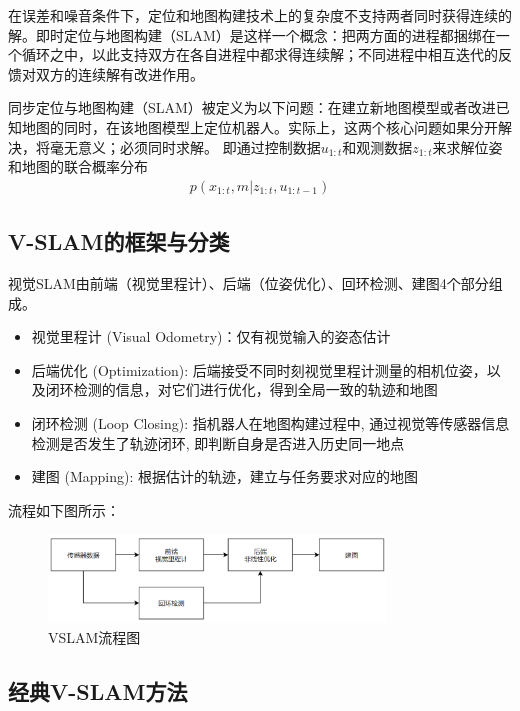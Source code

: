 \documentclass[cs4size,a4paper]{ctexart}
\numberwithin{equation}{section}
\numberwithin{table}{section}
\numberwithin{figure}{section}
\begin{document}
在误差和噪音条件下，定位和地图构建技术上的复杂度不支持两者同时获得连续的解。即时定位与地图构建（SLAM）是这样一个概念：把两方面的进程都捆绑在一个循环之中，以此支持双方在各自进程中都求得连续解；不同进程中相互迭代的反馈对双方的连续解有改进作用。

同步定位与地图构建（SLAM）被定义为以下问题：在建立新地图模型或者改进已知地图的同时，在该地图模型上定位机器人。实际上，这两个核心问题如果分开解决，将毫无意义；必须同时求解。
即通过控制数据$u_{1:t}$和观测数据$z_{1:t}$来求解位姿和地图的联合概率分布
\begin{align}
    p\left(x_{1: t}, m | z_{1: t}, u_{1: t-1}\right)
\end{align}

\subsection{V-SLAM的框架与分类}
视觉SLAM由前端（视觉里程计）、后端（位姿优化）、回环检测、建图4个部分组成。
\begin{itemize}
        \item  视觉里程计 (Visual Odometry)：仅有视觉输入的姿态估计\cite{1315094}
        \item 后端优化 (Optimization): 后端接受不同时刻视觉里程计测量的相机位姿，以及闭环检测的信息，对它们进行优化，得到全局一致的轨迹和地图\cite{9787121311048}
        \item 闭环检测 (Loop Closing): 指机器人在地图构建过程中, 通过视觉等传感器信息检测是否发生了轨迹闭环, 即判断自身是否进入历史同一地点\cite{9787121311048}
        \item  建图 (Mapping): 根据估计的轨迹，建立与任务要求对应的地图\cite{9787121311048}
\end{itemize}
流程如下图所示：

    \begin{figure}[H]
        \centering
        \includegraphics[width=0.8\textwidth]{figure/framework.png}
        \caption{VSLAM流程图\cite{9787121311048}}
    \end{figure}
    
\subsection{经典V-SLAM方法}
\end{document}

